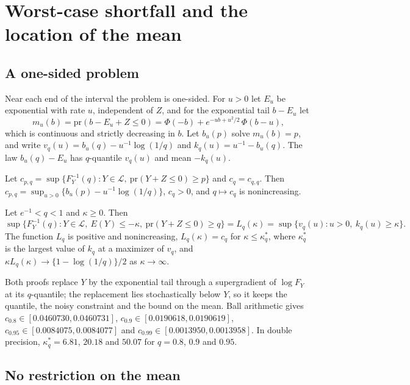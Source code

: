 \documentclass[lineno]{biometrika}
\newcommand{\pr}{\mathrm{pr}}
\newcommand{\LC}{\mathcal{L}}
\begin{document}
\section{Worst-case shortfall and the location of the mean}\label{sec:mean}

\subsection{A one-sided problem}

Near each end of the interval the problem is one-sided. For $u > 0$ let $E_u$ be exponential with rate $u$, independent of $Z$, and for the exponential tail $b - E_u$ let
\[
m_u(b) = \pr(b - E_u + Z \le 0) = \Phi(-b) + e^{-ub + u^2/2}\,\Phi(b - u),
\]
which is continuous and strictly decreasing in $b$. Let $b_u(p)$ solve $m_u(b) = p$, and write $v_q(u) = b_u(q) - u^{-1}\log(1/q)$ and $k_q(u) = u^{-1} - b_u(q)$. The law $b_u(q) - E_u$ has $q$-quantile $v_q(u)$ and mean $-k_q(u)$.

\begin{lemma}\label{lem:onesided}
Let $c_{p,q} = \sup\{F_Y^{-1}(q) : Y \in \LC,\ \pr(Y + Z \le 0) \ge p\}$ and $c_q = c_{q,q}$. Then $c_{p,q} = \sup_{u > 0}\{b_u(p) - u^{-1}\log(1/q)\}$, $c_q > 0$, and $q \mapsto c_q$ is nonincreasing.
\end{lemma}

\begin{lemma}\label{lem:meanonesided}
Let $e^{-1} < q < 1$ and $\kappa \ge 0$. Then
\[
\sup\{F_Y^{-1}(q) : Y \in \LC,\ E(Y) \le -\kappa,\ \pr(Y + Z \le 0) \ge q\} = L_q(\kappa) = \sup\{v_q(u) : u > 0,\ k_q(u) \ge \kappa\}.
\]
The function $L_q$ is positive and nonincreasing, $L_q(\kappa) = c_q$ for $\kappa \le \kappa^*_q$, where $\kappa^*_q$ is the largest value of $k_q$ at a maximizer of $v_q$, and $\kappa L_q(\kappa) \to \{1 - \log(1/q)\}/2$ as $\kappa \to \infty$.
\end{lemma}

Both proofs replace $Y$ by the exponential tail through a supergradient of $\log F_Y$ at its $q$-quantile; the replacement lies stochastically below $Y$, so it keeps the quantile, the noisy constraint and the bound on the mean. Ball arithmetic gives $c_{0.8} \in [0.0460730, 0.0460731]$, $c_{0.9} \in [0.0190618, 0.0190619]$, $c_{0.95} \in [0.0084075, 0.0084077]$ and $c_{0.99} \in [0.0013950, 0.0013958]$. In double precision, $\kappa^*_q = 6.81$, $20.18$ and $50.07$ for $q = 0.8$, $0.9$ and $0.95$.

\subsection{No restriction on the mean}
\end{document}
